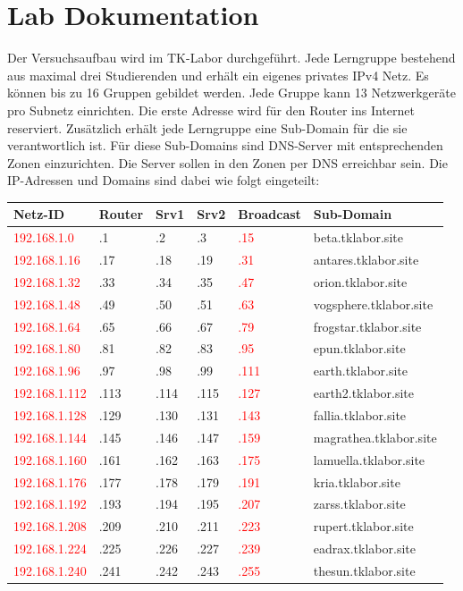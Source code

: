 \section{Lab Dokumentation}
Der Versuchsaufbau wird im TK-Labor durchgeführt. Jede Lerngruppe
bestehend aus maximal drei Studierenden und erhält ein eigenes privates IPv4
Netz. Es können bis zu 16 Gruppen gebildet werden. Jede Gruppe kann 13
Netzwerkgeräte pro Subnetz einrichten. Die erste Adresse wird für den Router ins
Internet reserviert. Zusätzlich erhält jede Lerngruppe eine Sub-Domain für die
sie verantwortlich ist. Für diese Sub-Domains sind DNS-Server mit entsprechenden
Zonen einzurichten. Die Server sollen in den Zonen per DNS erreichbar sein. Die
IP-Adressen und Domains sind dabei wie folgt eingeteilt:

\begin{tabular}[t]{l l l l l l}
\hline
Netz-ID & Router & Srv1 & Srv2 & Broadcast & Sub-Domain \\
\hline
\textcolor{red}{192.168.1.0} & .1 & .2 & .3 & \textcolor{red}{.15} &
beta.tklabor.site \\ \textcolor{red}{192.168.1.16} & .17 & .18 & .19 &
\textcolor{red}{.31} & antares.tklabor.site \\
\textcolor{red}{192.168.1.32} & .33 & .34 & .35 & \textcolor{red}{.47} &
orion.tklabor.site \\
\textcolor{red}{192.168.1.48} & .49 & .50 & .51 & \textcolor{red}{.63} &
vogsphere.tklabor.site \\
\hline
\textcolor{red}{192.168.1.64} & .65 & .66 & .67 & \textcolor{red}{.79} &
frogstar.tklabor.site \\
\textcolor{red}{192.168.1.80} & .81 & .82 & .83 & \textcolor{red}{.95} &
epun.tklabor.site \\
\textcolor{red}{192.168.1.96} & .97 & .98 & .99 & \textcolor{red}{.111} &
earth.tklabor.site \\
\textcolor{red}{192.168.1.112} & .113 & .114 & .115 & \textcolor{red}{.127} &
earth2.tklabor.site \\
\hline
\textcolor{red}{192.168.1.128} & .129 & .130 & .131 & \textcolor{red}{.143} &
fallia.tklabor.site \\
\textcolor{red}{192.168.1.144} & .145 & .146 & .147 & \textcolor{red}{.159} &
magrathea.tklabor.site \\
\textcolor{red}{192.168.1.160} & .161 & .162 & .163 & \textcolor{red}{.175} &
lamuella.tklabor.site \\
\textcolor{red}{192.168.1.176} & .177 & .178 & .179 & \textcolor{red}{.191} &
kria.tklabor.site \\
\hline
\textcolor{red}{192.168.1.192} & .193 & .194 & .195 & \textcolor{red}{.207} &
zarss.tklabor.site \\
\textcolor{red}{192.168.1.208} & .209 & .210 & .211 & \textcolor{red}{.223} &
rupert.tklabor.site \\
\textcolor{red}{192.168.1.224} & .225 & .226 & .227 & \textcolor{red}{.239} &
eadrax.tklabor.site \\
\textcolor{red}{192.168.1.240} & .241 & .242 & .243 & \textcolor{red}{.255} &
thesun.tklabor.site \\
\hline
\end{tabular}
